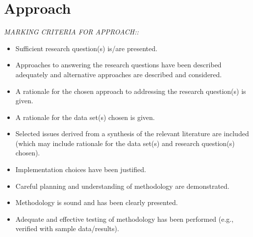 \section{Approach} 
\emph{MARKING CRITERIA FOR APPROACH:: }
\begin{itemize}
\item Sufficient research question(s) is/are presented.
\item Approaches to answering the research questions have been described adequately and alternative approaches are described and considered.
\item A rationale for the chosen approach to addressing the research question(s) is given.
\item A rationale for the data set(s) chosen is given.
\item Selected issues derived from a synthesis of the relevant literature are included (which may include rationale for the data set(s) and research question(s) chosen).
\item Implementation choices have been justified.
\item Careful planning and understanding of methodology are demonstrated.
\item Methodology is sound and has been clearly presented.
\item Adequate and effective testing of methodology has been performed (e.g., verified with sample data/results).
\end{itemize}
